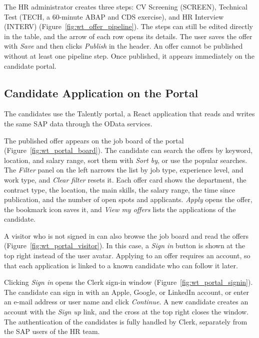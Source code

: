 The HR administrator creates three steps: CV Screening (SCREEN), Technical Test (TECH, a 60-minute ABAP and CDS exercise), and HR Interview (INTERV) (Figure~\ref{fig:wt_offer_pipeline}). The steps can still be edited directly in the table, and the arrow of each row opens its details. The user saves the offer with \emph{Save} and then clicks \emph{Publish} in the header. An offer cannot be published without at least one pipeline step. Once published, it appears immediately on the candidate portal.

\subsection{Candidate Application on the Portal}
\label{subsec:wt_apply}

The candidates use the Talently portal, a React application that reads and writes the same SAP data through the OData services.


The published offer appears on the job board of the portal (Figure~\ref{fig:wt_portal_board}). The candidate can search the offers by keyword, location, and salary range, sort them with \emph{Sort by}, or use the popular searches. The \emph{Filter} panel on the left narrows the list by job type, experience level, and work type, and \emph{Clear filter} resets it. Each offer card shows the department, the contract type, the location, the main skills, the salary range, the time since publication, and the number of open spots and applicants. \emph{Apply} opens the offer, the bookmark icon saves it, and \emph{View my offers} lists the applications of the candidate.


A visitor who is not signed in can also browse the job board and read the offers (Figure~\ref{fig:wt_portal_visitor}). In this case, a \emph{Sign in} button is shown at the top right instead of the user avatar. Applying to an offer requires an account, so that each application is linked to a known candidate who can follow it later.


Clicking \emph{Sign in} opens the Clerk sign-in window (Figure~\ref{fig:wt_portal_signin}). The candidate can sign in with an Apple, Google, or LinkedIn account, or enter an e-mail address or user name and click \emph{Continue}. A new candidate creates an account with the \emph{Sign up} link, and the cross at the top right closes the window. The authentication of the candidates is fully handled by Clerk, separately from the SAP users of the HR team.

